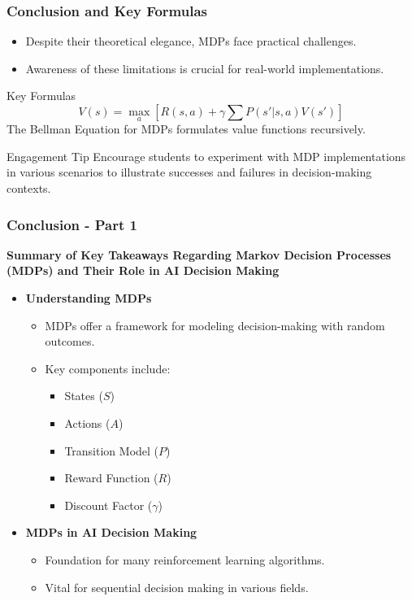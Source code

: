 \documentclass[aspectratio=169]{beamer}
\begin{document}
\begin{frame}[fragile]
    \frametitle{Conclusion and Key Formulas}
    \begin{itemize}
        \item Despite their theoretical elegance, MDPs face practical challenges.
        \item Awareness of these limitations is crucial for real-world implementations.
    \end{itemize}
    
    \begin{block}{Key Formulas}
        \begin{equation}
            V(s) = \max_a \left[ R(s,a) + \gamma \sum P(s'|s,a)V(s') \right]
        \end{equation}
        The Bellman Equation for MDPs formulates value functions recursively.
    \end{block}
    
    \begin{block}{Engagement Tip}
        Encourage students to experiment with MDP implementations in various scenarios to illustrate successes and failures in decision-making contexts.
    \end{block}
\end{frame}

\begin{frame}[fragile]
    \frametitle{Conclusion - Part 1}
    \textbf{Summary of Key Takeaways Regarding Markov Decision Processes (MDPs) and Their Role in AI Decision Making}
    
    \begin{itemize}
        \item \textbf{Understanding MDPs}
        \begin{itemize}
            \item MDPs offer a framework for modeling decision-making with random outcomes.
            \item Key components include:
            \begin{itemize}
                \item States (\(S\))
                \item Actions (\(A\))
                \item Transition Model (\(P\))
                \item Reward Function (\(R\))
                \item Discount Factor (\(\gamma\))
            \end{itemize}
        \end{itemize}
        
        \item \textbf{MDPs in AI Decision Making}
        \begin{itemize}
            \item Foundation for many reinforcement learning algorithms.
            \item Vital for sequential decision making in various fields.
        \end{itemize}
    \end{itemize}
\end{frame}
\end{document}
